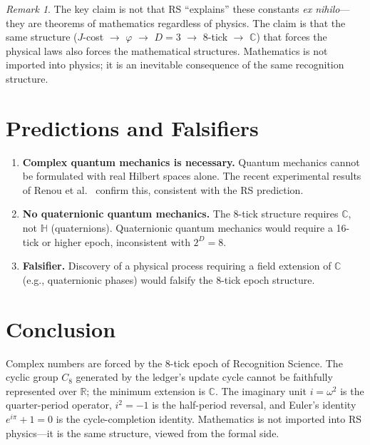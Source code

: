 \documentclass[12pt,a4paper]{article}
\theoremstyle{definition}
\theoremstyle{remark}
\newtheorem{remark}[theorem]{Remark}
\begin{document}
\begin{remark}
The key claim is not that RS ``explains'' these constants
\emph{ex nihilo}---they are theorems of mathematics regardless
of physics.  The claim is that the same structure
($J$-cost $\to$ $\varphi$ $\to$ $D = 3$ $\to$ 8-tick
$\to$ $\mathbb{C}$) that forces the physical laws also forces
the mathematical structures.  Mathematics is not imported into
physics; it is an inevitable consequence of the same
recognition structure.
\end{remark}

\section{Predictions and Falsifiers}
\label{sec:predictions}

\begin{enumerate}
  \item \textbf{Complex quantum mechanics is necessary.}
  Quantum mechanics cannot be formulated with real Hilbert
  spaces alone.  The recent experimental results of
  Renou et al.~\cite{Renou2021} confirm this, consistent
  with the RS prediction.

  \item \textbf{No quaternionic quantum mechanics.}
  The 8-tick structure requires $\mathbb{C}$, not
  $\mathbb{H}$ (quaternions).  Quaternionic quantum
  mechanics would require a 16-tick or higher epoch,
  inconsistent with $2^D = 8$.

  \item \textbf{Falsifier.}
  Discovery of a physical process requiring a field
  extension of $\mathbb{C}$ (e.g., quaternionic phases)
  would falsify the 8-tick epoch structure.
\end{enumerate}

\section{Conclusion}
\label{sec:conclusion}

Complex numbers are forced by the 8-tick epoch of Recognition
Science.  The cyclic group $C_8$ generated by the ledger's
update cycle cannot be faithfully represented over
$\mathbb{R}$; the minimum extension is $\mathbb{C}$.  The
imaginary unit $i = \omega^2$ is the quarter-period operator,
$i^2 = -1$ is the half-period reversal, and Euler's identity
$e^{i\pi} + 1 = 0$ is the cycle-completion identity.
Mathematics is not imported into RS physics---it is the same
structure, viewed from the formal side.
\end{document}
